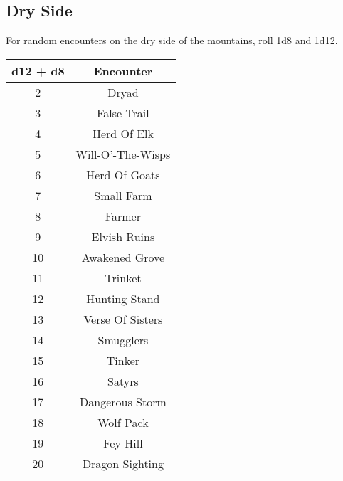 \subsection{Dry Side}

For random encounters on the dry side of the mountains, roll 1d8 and 1d12.

\begin{tabular}{|c|c|}

\hline

\textbf{d12 + d8} & \textbf{Encounter}\\

\hline

2 & Dryad\\

3 & False Trail\\

4 & Herd Of Elk\\

5 & Will-O'-The-Wisps\\

6 & Herd Of Goats\\

7 & Small Farm\\

8 & Farmer\\

9 & Elvish Ruins\\

10 & Awakened Grove\\

11 & Trinket\\

12 & Hunting Stand\\

13 & Verse Of Sisters\\

14 & Smugglers\\

15 & Tinker\\

16 & Satyrs\\

17 & Dangerous Storm\\

18 & Wolf Pack\\

19 & Fey Hill\\

20 & Dragon Sighting\\

\hline

\end{tabular}

